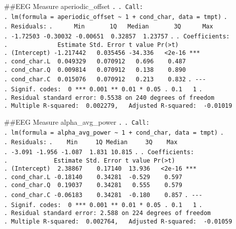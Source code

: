 \documentclass[
]{article}
\begin{document}
\#\#EEG Measure aperiodic\_offset \texttt{.} \texttt{.\ Call:}
\texttt{.\ lm(formula\ =\ aperiodic\_offset\ \textasciitilde{}\ 1\ +\ cond\_char,\ data\ =\ tmpt)}
\texttt{.} \texttt{.\ Residuals:}
\texttt{.\ \ \ \ \ \ Min\ \ \ \ \ \ \ 1Q\ \ \ Median\ \ \ \ \ \ \ 3Q\ \ \ \ \ \ Max}
\texttt{.\ -1.72503\ -0.30032\ -0.00651\ \ 0.32857\ \ 1.23757}
\texttt{.} \texttt{.\ Coefficients:}
\texttt{.\ \ \ \ \ \ \ \ \ \ \ \ \ \ Estimate\ Std.\ Error\ t\ value\ Pr(\textgreater{}\textbar{}t\textbar{})}
\texttt{.\ (Intercept)\ -1.217442\ \ \ 0.035456\ -34.336\ \ \ \textless{}2e-16\ ***}
\texttt{.\ cond\_char.L\ \ 0.049329\ \ \ 0.070912\ \ \ 0.696\ \ \ \ 0.487}
\texttt{.\ cond\_char.Q\ \ 0.009814\ \ \ 0.070912\ \ \ 0.138\ \ \ \ 0.890}
\texttt{.\ cond\_char.C\ \ 0.015076\ \ \ 0.070912\ \ \ 0.213\ \ \ \ 0.832}
\texttt{.\ -\/-\/-}
\texttt{.\ Signif.\ codes:\ \ 0\ \textquotesingle{}***\textquotesingle{}\ 0.001\ \textquotesingle{}**\textquotesingle{}\ 0.01\ \textquotesingle{}*\textquotesingle{}\ 0.05\ \textquotesingle{}.\textquotesingle{}\ 0.1\ \textquotesingle{}\ \textquotesingle{}\ 1}
\texttt{.}
\texttt{.\ Residual\ standard\ error:\ 0.5538\ on\ 240\ degrees\ of\ freedom}
\texttt{.\ Multiple\ R-squared:\ \ 0.002279,\ \ \ Adjusted\ R-squared:\ \ -0.01019}

\#\#EEG Measure alpha\_avg\_power \texttt{.} \texttt{.\ Call:}
\texttt{.\ lm(formula\ =\ alpha\_avg\_power\ \textasciitilde{}\ 1\ +\ cond\_char,\ data\ =\ tmpt)}
\texttt{.} \texttt{.\ Residuals:}
\texttt{.\ \ \ \ Min\ \ \ \ \ 1Q\ Median\ \ \ \ \ 3Q\ \ \ \ Max}
\texttt{.\ -3.091\ -1.956\ -1.087\ \ 1.831\ 10.815} \texttt{.}
\texttt{.\ Coefficients:}
\texttt{.\ \ \ \ \ \ \ \ \ \ \ \ \ Estimate\ Std.\ Error\ t\ value\ Pr(\textgreater{}\textbar{}t\textbar{})}
\texttt{.\ (Intercept)\ \ 2.38867\ \ \ \ 0.17140\ \ 13.936\ \ \ \textless{}2e-16\ ***}
\texttt{.\ cond\_char.L\ -0.18140\ \ \ \ 0.34281\ \ -0.529\ \ \ \ 0.597}
\texttt{.\ cond\_char.Q\ \ 0.19037\ \ \ \ 0.34281\ \ \ 0.555\ \ \ \ 0.579}
\texttt{.\ cond\_char.C\ -0.06183\ \ \ \ 0.34281\ \ -0.180\ \ \ \ 0.857}
\texttt{.\ -\/-\/-}
\texttt{.\ Signif.\ codes:\ \ 0\ \textquotesingle{}***\textquotesingle{}\ 0.001\ \textquotesingle{}**\textquotesingle{}\ 0.01\ \textquotesingle{}*\textquotesingle{}\ 0.05\ \textquotesingle{}.\textquotesingle{}\ 0.1\ \textquotesingle{}\ \textquotesingle{}\ 1}
\texttt{.}
\texttt{.\ Residual\ standard\ error:\ 2.588\ on\ 224\ degrees\ of\ freedom}
\texttt{.\ Multiple\ R-squared:\ \ 0.002764,\ \ \ Adjusted\ R-squared:\ \ -0.01059}
\end{document}
